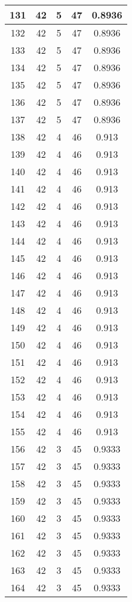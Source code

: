 \documentclass[letterpaper, 12pt]{article}
\begin{document}
\begin{longtable}{|c|c|c|c|c|}
\hline
131 & 42 & 5 & 47 & 0.8936 \\
\hline
132 & 42 & 5 & 47 & 0.8936 \\
\hline
133 & 42 & 5 & 47 & 0.8936 \\
\hline
134 & 42 & 5 & 47 & 0.8936 \\
\hline
135 & 42 & 5 & 47 & 0.8936 \\
\hline
136 & 42 & 5 & 47 & 0.8936 \\
\hline
137 & 42 & 5 & 47 & 0.8936 \\
\hline
138 & 42 & 4 & 46 & 0.913 \\
\hline
139 & 42 & 4 & 46 & 0.913 \\
\hline
140 & 42 & 4 & 46 & 0.913 \\
\hline
141 & 42 & 4 & 46 & 0.913 \\
\hline
142 & 42 & 4 & 46 & 0.913 \\
\hline
143 & 42 & 4 & 46 & 0.913 \\
\hline
144 & 42 & 4 & 46 & 0.913 \\
\hline
145 & 42 & 4 & 46 & 0.913 \\
\hline
146 & 42 & 4 & 46 & 0.913 \\
\hline
147 & 42 & 4 & 46 & 0.913 \\
\hline
148 & 42 & 4 & 46 & 0.913 \\
\hline
149 & 42 & 4 & 46 & 0.913 \\
\hline
150 & 42 & 4 & 46 & 0.913 \\
\hline
151 & 42 & 4 & 46 & 0.913 \\
\hline
152 & 42 & 4 & 46 & 0.913 \\
\hline
153 & 42 & 4 & 46 & 0.913 \\
\hline
154 & 42 & 4 & 46 & 0.913 \\
\hline
155 & 42 & 4 & 46 & 0.913 \\
\hline
156 & 42 & 3 & 45 & 0.9333 \\
\hline
157 & 42 & 3 & 45 & 0.9333 \\
\hline
158 & 42 & 3 & 45 & 0.9333 \\
\hline
159 & 42 & 3 & 45 & 0.9333 \\
\hline
160 & 42 & 3 & 45 & 0.9333 \\
\hline
161 & 42 & 3 & 45 & 0.9333 \\
\hline
162 & 42 & 3 & 45 & 0.9333 \\
\hline
163 & 42 & 3 & 45 & 0.9333 \\
\hline
164 & 42 & 3 & 45 & 0.9333 \\

\end{longtable}
\end{document}
